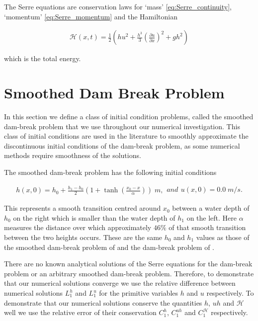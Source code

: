 \documentclass[times]{elsarticle}
\begin{document}
The Serre equations are conservation laws for `mass' \eqref{eq:Serre_continuity}, `momentum' \eqref{eq:Serre_momentum} and the Hamiltonian \cite{Li-Y-2002,Green-Naghdi-1976-237}
\begin{linenomath*}
	\begin{gather}
	\label{eqn:Hamildef}
	\mathcal{H}(x,t) = \frac{1}{2} \left(hu^2 + \frac{h^3}{3} \left(\frac{\partial u}{\partial x}\right)^2 + gh^2\right)
	\end{gather}
\end{linenomath*}
which is the total energy.
\section{Smoothed Dam Break Problem}
\label{section:smootheddambreak}
In this section we define a class of initial condition problems, called the smoothed dam-break problem that we use throughout our numerical investigation. This class of initial conditions are used in the literature \cite{Mitsotakis-etal-2014,Mitsotakis-etal-2017} to smoothly approximate the discontinuous initial conditions of the dam-break problem, as some numerical methods require smoothness of the solutions.

The smoothed dam-break problem has the following initial conditions
\begin{linenomath*}
\begin{subequations}
\begin{gather}
h(x,0) = h_0 + \frac{h_1 - h_0}{2}\left(1 + \tanh\left(\frac{x_0 - x}{\alpha}\right)\right)\; m,
\end{gather} 
and
\begin{gather}
u(x,0) = 0.0 \;m/s.
\end{gather}
\label{eq:sdbi}
\end{subequations}
\end{linenomath*}
This represents a smooth transition centred around $x_0$ between a water depth of $h_0$ on the right which is smaller than the water depth of $h_1$ on the left. Here $\alpha$ measures the distance over which approximately $46\%$ of that smooth transition between the two heights occurs. These are the same $h_0$ and $h_1$ values as those of the smoothed dam-break problem of \citet{El-etal-2006} and the dam-break problem of \citet{Hank-etal-2010-2034}.

There are no known analytical solutions of the Serre equations for the dam-break problem or an arbitrary smoothed dam-break problem. Therefore, to demonstrate that our numerical solutions converge we use the relative difference between numerical solutions $L^h_{1}$ and $L^u_{1}$ for the primitive variables $h$ and $u$ respectively. To demonstrate that our numerical solutions conserve the quantities $h$, $uh$ and $\mathcal{H}$ well we use the relative error of their conservation $C_1^{h}$, $C_1^{uh}$ and $C_1^{\mathcal{H}}$ respectively.
\end{document}
